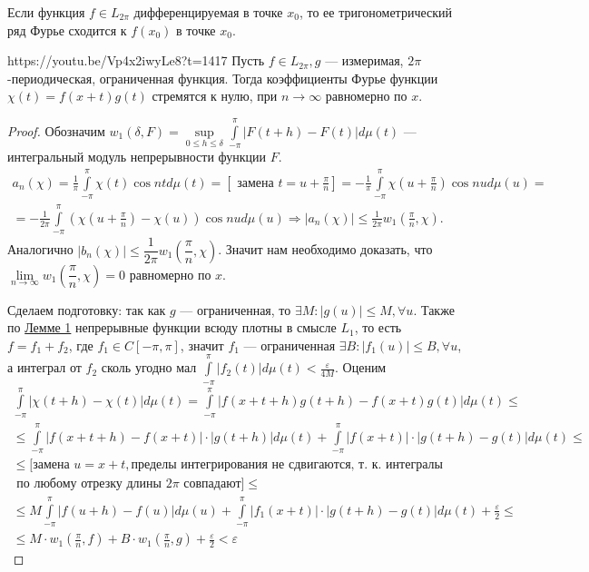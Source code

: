 \begin{corollary}
	Если функция $f\in L_{2\pi}$ дифференцируемая в точке $x_0$, то ее тригонометрический ряд Фурье сходится к $f(x_0)$ в точке $x_0$.
\end{corollary}

\begin{linklm}{https://youtu.be/Vp4x2iwyLe8?t=1417}
	Пусть $f\in L_{2\pi}, g$ --- измеримая, $2\pi$-периодическая, ограниченная функция. Тогда коэффициенты Фурье функции $\chi(t)=f(x+t)g(t)$ стремятся к нулю, при $n\to\infty$ равномерно по $x$.
\end{linklm}

\begin{proof}
	Обозначим $w_1(\delta, F)=\sup\limits_{0\leqslant h\leqslant \delta}\int\limits_{-\pi}^\pi|F(t+h)-F(t)|d\mu(t)$ --- интегральный модуль непрерывности функции $F$. 
	\begin{multline*}
		a_n(\chi)=\frac{1}{\pi}\int\limits_{-\pi}^\pi \chi(t)\cos ntd\mu(t)=\left[\text{ замена }t=u+\frac{\pi}{n}\right]=-\frac{1}{\pi}\int\limits_{-\pi}^\pi \chi\left(u+\frac{\pi}{n}\right)\cos nud\mu(u)=\\=-\frac{1}{2\pi}\int\limits_{-\pi}^\pi\left(\chi\left(u+\frac{\pi}{n}\right)-\chi(u) \right)\cos nud\mu(u)\Rightarrow |a_n(\chi)|\leqslant \frac{1}{2\pi}w_1(\frac{\pi}{n},\chi).
	\end{multline*}
Аналогично $|b_n(\chi)|\leqslant\dfrac{1}{2\pi}w_1\left(\dfrac{\pi}{n},\chi\right)$. Значит нам необходимо доказать, что $\lim\limits_{n\to\infty}w_1(\dfrac{\pi}{n},\chi)=0$ равномерно по $x$.

Сделаем подготовку: так как $g$ --- ограниченная, то $\exists M: |g(u)|\leqslant M, \forall u$. Также по \hyperref[lemma_12.1.1]{Лемме 1} непрерывные функции всюду плотны в смысле $L_1$, то есть $f=f_1+f_2$, где $f_1\in C[-\pi,\pi]$, значит $f_1$ --- ограниченная $\exists B:|f_1(u)|\leqslant B,\forall u$, а интеграл от $f_2$ сколь угодно мал $\int\limits_{-\pi}^\pi |f_2(t)|d\mu(t)<\frac{\varepsilon}{4M}$. Оценим
\begin{multline*}
	\int\limits_{-\pi}^\pi|\chi(t+h)-\chi(t)|d\mu(t)=\int\limits_{-\pi}^\pi|f(x+t+h)g(t+h)-f(x+t)g(t)|d\mu(t)\leqslant\\ \leqslant\int\limits_{-\pi}^\pi|f(x+t+h)-f(x+t)|\cdot|g(t+h)|d\mu(t)+\int\limits_{-\pi}^\pi|f(x+t)|\cdot |g(t+h)-g(t)|d\mu(t)\leqslant\\ \leqslant[\text{замена }u=x+t, \text{пределы интегрирования не сдвигаются, т. к. интегралы}\\ \text{ по любому отрезку длины }2\pi\text{ совпадают}]\leqslant\\ \leqslant M\int\limits_{-\pi}^\pi|f(u+h)-f(u)|d\mu(u)+\int\limits_{-\pi}^\pi|f_1(x+t)|\cdot|g(t+h)-g(t)|d\mu(t)+\frac{\varepsilon}{2}\leqslant\\ \leqslant M\cdot w_1(\frac{\pi}{n},f)+B\cdot w_1(\frac{\pi}{n},g)+\frac{\varepsilon}{2}<\varepsilon
\end{multline*}
\end{proof}

